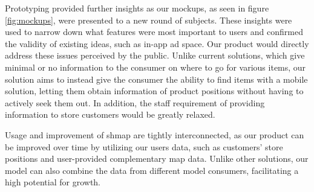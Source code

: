 \documentclass[titlepage]{article}
\begin{document}
Prototyping provided further insights as our mockups, as seen in figure \ref{fig:mockups}, were presented to a new round of subjects. 
These insights were used to narrow down what features were most important to users and confirmed the validity of existing ideas, such as in-app ad space. 
Our product would directly address these issues perceived by the public. Unlike current solutions, which give minimal or no information to the consumer on where to go for various items,
our solution aims to instead give the consumer the ability to find items with a mobile solution,
letting them obtain information of product positions without having to actively seek them out.
In addition, the staff requirement of providing information to store customers would be greatly relaxed.

Usage and improvement of shmap are tightly interconnected, as our product can be improved over time by utilizing our users data, such as customers' store positions and user-provided complementary map data.
Unlike other solutions, our model can also combine the data from different model consumers, facilitating a high potential for growth.
\end{document}

